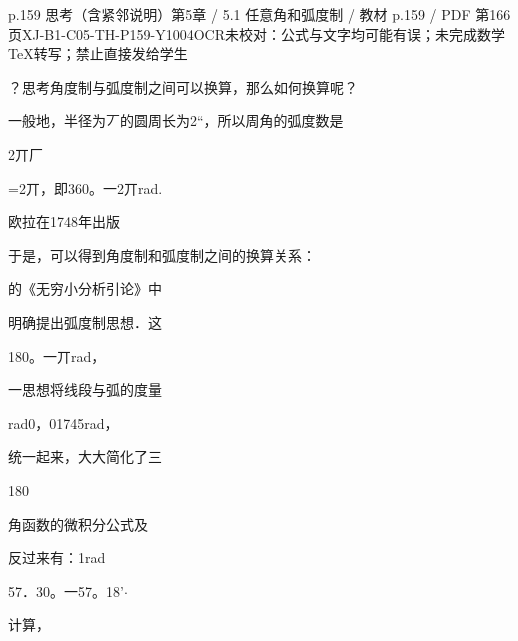 \begin{bankitem}{p.159 思考（含紧邻说明）}{第5章 / 5.1 任意角和弧度制 / 教材 p.159 / PDF 第166页}{XJ-B1-C05-TH-P159-Y1004}{OCR未校对：公式与文字均可能有误；未完成数学TeX转写；禁止直接发给学生}
\begin{ocrdraft}
\par
？思考角度制与弧度制之间可以换算，那么如何换算呢？
\par
一般地，半径为丆的圆周长为2“，所以周角的弧度数是
\par
2丌厂
\par
=2丌，即360。一2丌rad.
\par
欧拉在1748年出版
\par
于是，可以得到角度制和弧度制之间的换算关系：
\par
的《无穷小分析引论》中
\par
明确提出弧度制思想．这
\par
180。一丌rad，
\par
一思想将线段与弧的度量
\par
rad0，01745rad，
\par
统一起来，大大简化了三
\par
180
\par
角函数的微积分公式及
\par
反过来有：1rad
\par
57．30。一57。18'\ensuremath{\cdot}
\par
计算，
\end{ocrdraft}
\end{bankitem}
